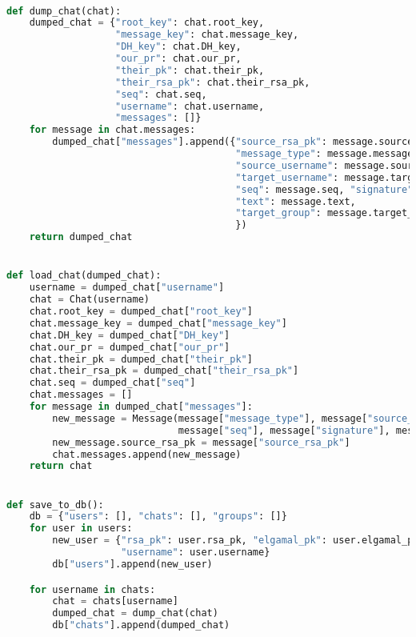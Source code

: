 ‫
\begin{latin}
\begin{lstlisting}[firstnumber=35, language=Python]
def dump_chat(chat):
    dumped_chat = {"root_key": chat.root_key,
                   "message_key": chat.message_key,
                   "DH_key": chat.DH_key,
                   "our_pr": chat.our_pr,
                   "their_pk": chat.their_pk,
                   "their_rsa_pk": chat.their_rsa_pk,
                   "seq": chat.seq,
                   "username": chat.username,
                   "messages": []}
    for message in chat.messages:
        dumped_chat["messages"].append({"source_rsa_pk": message.source_rsa_pk,
                                        "message_type": message.message_type,
                                        "source_username": message.source_username,
                                        "target_username": message.target_username,
                                        "seq": message.seq, "signature": message.signature,
                                        "text": message.text,
                                        "target_group": message.target_group
                                        })
    return dumped_chat


def load_chat(dumped_chat):
    username = dumped_chat["username"]
    chat = Chat(username)
    chat.root_key = dumped_chat["root_key"]
    chat.message_key = dumped_chat["message_key"]
    chat.DH_key = dumped_chat["DH_key"]
    chat.our_pr = dumped_chat["our_pr"]
    chat.their_pk = dumped_chat["their_pk"]
    chat.their_rsa_pk = dumped_chat["their_rsa_pk"]
    chat.seq = dumped_chat["seq"]
    chat.messages = []
    for message in dumped_chat["messages"]:
        new_message = Message(message["message_type"], message["source_username"], message["target_username"],
                              message["seq"], message["signature"], message["text"], message["target_group"])
        new_message.source_rsa_pk = message["source_rsa_pk"]
        chat.messages.append(new_message)
    return chat


def save_to_db():
    db = {"users": [], "chats": [], "groups": []}
    for user in users:
        new_user = {"rsa_pk": user.rsa_pk, "elgamal_pk": user.elgamal_pk, "prekey_pk": user.prekey_pk,
                    "username": user.username}
        db["users"].append(new_user)

    for username in chats:
        chat = chats[username]
        dumped_chat = dump_chat(chat)
        db["chats"].append(dumped_chat)


\end{lstlisting}
\end{latin}
